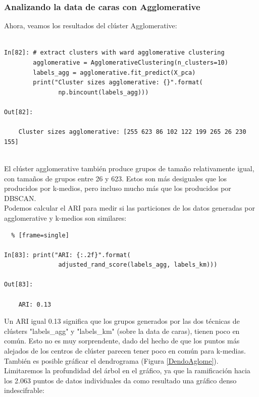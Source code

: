 \subsubsection{Analizando la data de caras con  Agglomerative}

 Ahora, veamos los resultados del  clúster Agglomerative:

\begin{lstlisting} 

In[82]: # extract clusters with ward agglomerative clustering
        agglomerative = AgglomerativeClustering(n_clusters=10)
        labels_agg = agglomerative.fit_predict(X_pca)
        print("Cluster sizes agglomerative: {}".format(
               np.bincount(labels_agg)))

Out[82]:

    Cluster sizes agglomerative: [255 623 86 102 122 199 265 26 230 155]


\end{lstlisting} 

El clúster agglomerative también produce grupos de tamaño relativamente igual, con tamaños de grupos entre 26 y 623. Estos son más desiguales que los producidos por k-medios, pero  incluso mucho más  que los producidos por DBSCAN. \\

Podemos calcular el ARI para medir si las  particiones de los datos generadas por agglomerative y k-medios son similares:

\begin{lstlisting}  % [frame=single]	

In[83]: print("ARI: {:.2f}".format(
               adjusted_rand_score(labels_agg, labels_km)))

Out[83]:

    ARI: 0.13

\end{lstlisting} 


Un ARI igual{}   0.13   {}significa que los grupos generados por las dos  técnicas de clústers  {\ttfamily "{}labels\_agg"{} }  y  {\ttfamily "{}labels\_km"{}} (sobre la data de caras), tienen  poco en  común. Esto no es muy sorprendente, dado del hecho de que los puntos más alejados de los centros de clúster parecen tener poco en común para  k-medias.\\

También es posible  gráficar el dendrograma (Figura \ref{DendoAglome}).   Limitaremos la profundidad del árbol en el gráfico, ya que la ramificación hacia los 2.063 puntos de datos individuales da como resultado una gráfico denso indescifrable:


